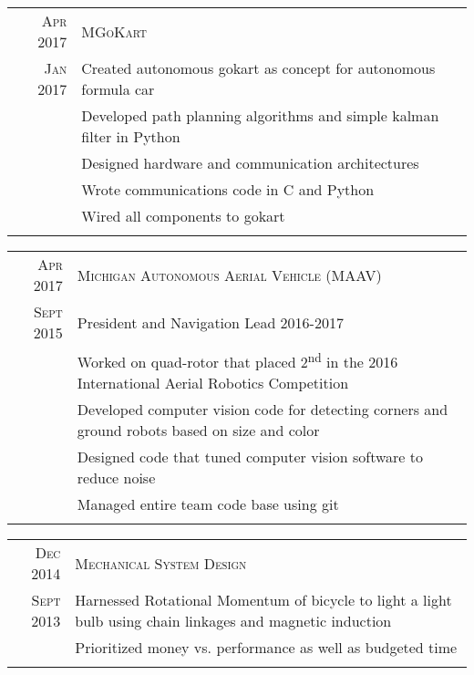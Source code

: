 \documentclass[a4paper,10pt]{article} %
\begin{document}
\begin{tabular}{r|p{13cm}}
\textsc{Apr 2017}\space\space& \textsc{MGoKart} \\
\textsc{Jan 2017} & \footnotesize{Created autonomous gokart as concept for autonomous formula car} \\
& \footnotesize{Developed path planning algorithms and simple kalman filter in Python} \\
& \footnotesize{Designed hardware and communication architectures} \\
& \footnotesize{Wrote communications code in C and Python} \\
& \footnotesize{Wired all components to gokart} \\
\multicolumn{2}{c}{} \\
\end{tabular}


\begin{tabular}{r|p{13cm}}
\textsc{Apr 2017} & \textsc{Michigan Autonomous Aerial Vehicle (MAAV)} \\
\textsc{Sept 2015} & \footnotesize{President and Navigation Lead 2016-2017} \\
& \footnotesize{Worked on quad-rotor that placed 2\textsuperscript{nd} in the
  2016 International Aerial Robotics Competition} \\
& \footnotesize{Developed computer vision code for detecting corners and
  ground robots based on size and color} \\
& \footnotesize{Designed code that tuned computer vision software to reduce noise} \\
& \footnotesize{Managed entire team code base using git} \\
\multicolumn{2}{c}{} \\
\end{tabular}


\begin{tabular}{r|p{13cm}}
\textsc{Dec	2014} & \textsc{Mechanical System Design} \\
\textsc{Sept 2013} & \footnotesize{Harnessed Rotational Momentum of bicycle to
  light a light bulb using chain linkages and magnetic induction} \\
& \footnotesize{Prioritized money vs. performance as well as budgeted time} \\
\multicolumn{2}{c}{} \\
\end{tabular}
\end{document}
